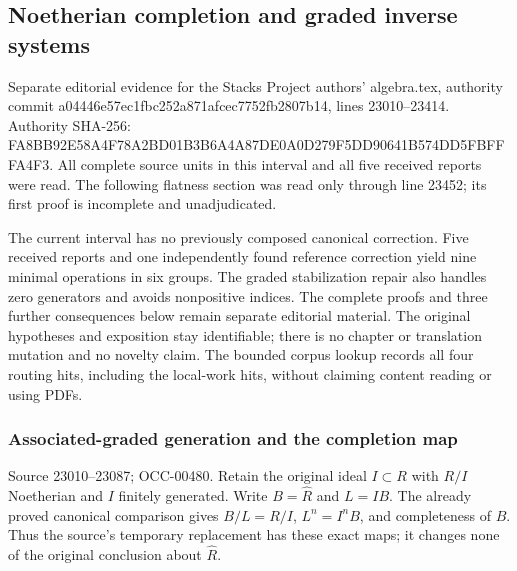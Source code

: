 \subsection{Noetherian completion and graded inverse systems}\label{algebra-proof-015-noetherian-completion-and-graded-inverse-systems}

Separate editorial evidence for the Stacks Project authors' algebra.tex, authority commit a04446e57ec1fbc252a871afcec7752fb2807b14, lines 23010--23414. Authority SHA-256: FA8BB92E58A4F78A2BD01B3B6A4A87DE0A0D279F5DD90641B574DD5FBFFFA4F3. All complete source units in this interval and all five received reports were read. The following flatness section was read only through line 23452; its first proof is incomplete and unadjudicated.

The current interval has no previously composed canonical correction. Five received reports and one independently found reference correction yield nine minimal operations in six groups. The graded stabilization repair also handles zero generators and avoids nonpositive indices. The complete proofs and three further consequences below remain separate editorial material. The original hypotheses and exposition stay identifiable; there is no chapter or translation mutation and no novelty claim. The bounded corpus lookup records all four routing hits, including the local-work hits, without claiming content reading or using PDFs.

\subsubsection{Associated-graded generation and the completion map}\label{algebra-proof-015-associated-graded-generation-and-the-completion-map}

Source 23010--23087; OCC-00480. Retain the original ideal \(I\subset R\) with \(R/I\) Noetherian and \(I\) finitely generated. Write \(B=\widehat R\) and \(L=IB\). The already proved canonical comparison gives \(B/L=R/I\), \(L^n=I^nB\), and completeness of \(B\). Thus the source's temporary replacement has these exact maps; it changes none of the original conclusion about \(\widehat R\).

